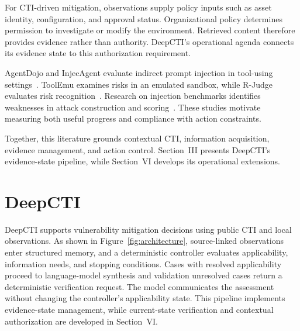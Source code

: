 \documentclass[conference]{IEEEtran}
\begin{document}
For CTI-driven mitigation, observations supply policy inputs such as
asset identity, configuration, and approval status. Organizational
policy determines permission to investigate or modify the environment.
Retrieved content therefore provides evidence rather than authority.
DeepCTI's operational agenda connects its evidence state to this
authorization requirement.

AgentDojo and InjecAgent evaluate indirect prompt injection in
tool-using settings~\cite{debenedetti2024agentdojo,zhan2024injecagent}.
ToolEmu examines risks in an emulated sandbox, while R-Judge evaluates
risk recognition~\cite{ruan2024toolemu,yuan2024rjudge}.
Research on injection benchmarks identifies weaknesses in attack
construction and scoring~\cite{bhagwatkar2025injectionbenchmarks}.
These studies motivate measuring both useful progress and compliance
with action constraints.

Together, this literature grounds contextual CTI, information
acquisition, evidence management, and action control. Section~III
presents DeepCTI's evidence-state pipeline, while Section~VI develops
its operational extensions.

\section{DeepCTI}

DeepCTI supports vulnerability mitigation decisions using public CTI
and local observations. As shown in Figure~\ref{fig:architecture},
source-linked observations enter structured memory, and a deterministic
controller evaluates applicability, information needs, and stopping
conditions. Cases with resolved applicability proceed to language-model synthesis and validation unresolved cases return a deterministic verification
request. The model communicates the assessment without changing the
controller's applicability state. This pipeline implements evidence-state
management, while current-state verification and contextual authorization
are developed in Section~VI.
\end{document}
